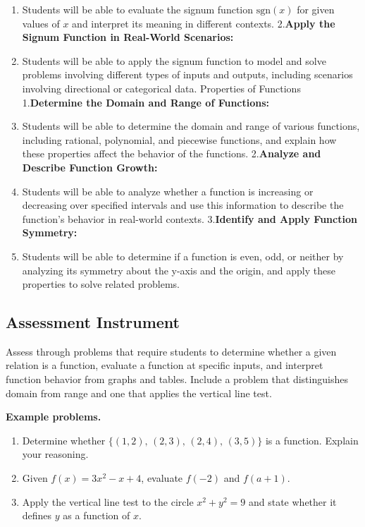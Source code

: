 \begin{enumerate}
    \item Students will be able to evaluate the signum function $ \text{sgn}(x) $ for given values of $ x $ and interpret its meaning in different contexts. 2.\textbf{Apply the Signum Function in Real-World Scenarios:}
    \item Students will be able to apply the signum function to model and solve problems involving different types of inputs and outputs, including scenarios involving directional or categorical data. Properties of Functions 1.\textbf{Determine the Domain and Range of Functions:}
    \item Students will be able to determine the domain and range of various functions, including rational, polynomial, and piecewise functions, and explain how these properties affect the behavior of the functions. 2.\textbf{Analyze and Describe Function Growth:}
    \item Students will be able to analyze whether a function is increasing or decreasing over specified intervals and use this information to describe the function's behavior in real-world contexts. 3.\textbf{Identify and Apply Function Symmetry:}
    \item Students will be able to determine if a function is even, odd, or neither by analyzing its symmetry about the y-axis and the origin, and apply these properties to solve related problems.
\end{enumerate}

\subsection{Assessment Instrument}
\label{ssec:asse-1481}

Assess through problems that require students to determine whether a given relation is a
function, evaluate a function at specific inputs, and interpret function behavior from
graphs and tables. Include a problem that distinguishes domain from range and one that
applies the vertical line test.

\textbf{Example problems.}

\begin{enumerate}
    \item Determine whether $\{(1,2),\,(2,3),\,(2,4),\,(3,5)\}$ is a function. Explain your reasoning.
    \item Given $f(x) = 3x^2 - x + 4$, evaluate $f(-2)$ and $f(a + 1)$.
    \item Apply the vertical line test to the circle $x^2 + y^2 = 9$ and state whether it defines $y$ as a function of $x$.
\end{enumerate}

